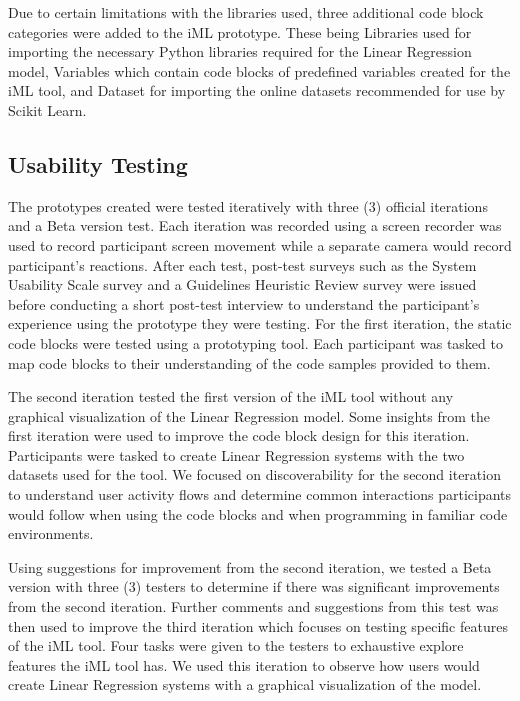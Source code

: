 \documentclass{sigchi}
\begin{document}
Due to certain limitations with the libraries used, three additional code block categories were added to the iML prototype. These being Libraries used for importing the necessary Python libraries required for the Linear Regression model, Variables which contain code blocks of predefined variables created for the iML tool, and Dataset for importing the online datasets recommended for use by Scikit Learn. 

\subsection{Usability Testing}
The prototypes created were tested iteratively with three (3) official iterations and a Beta version test. Each iteration was recorded using a screen recorder was used to record participant screen movement while a separate camera would record participant's reactions. After each test, post-test surveys such as the System Usability Scale survey and a Guidelines Heuristic Review survey were issued before conducting a short post-test interview to understand the participant's experience using the prototype they were testing. For the first iteration, the static code blocks were tested using a prototyping tool. Each participant was tasked to map code blocks to their understanding of the code samples provided to them.

The second iteration tested the first version of the iML tool without any graphical visualization of the Linear Regression model. Some insights from the first iteration were used to improve the code block design for this iteration. Participants were tasked to create Linear Regression systems with the two datasets used for the tool. We focused on discoverability for the second iteration to understand user activity flows and determine common interactions participants would follow when using the code blocks and when programming in familiar code environments.

Using suggestions for improvement from the second iteration, we tested a Beta version with three (3) testers to determine if there was significant improvements from the second iteration. Further comments and suggestions from this test was then used to improve the third iteration which focuses on testing specific features of the iML tool. Four tasks were given to the testers to exhaustive explore features the iML tool has. We used this iteration to observe how users would create Linear Regression systems with a graphical visualization of the model.
\end{document}
